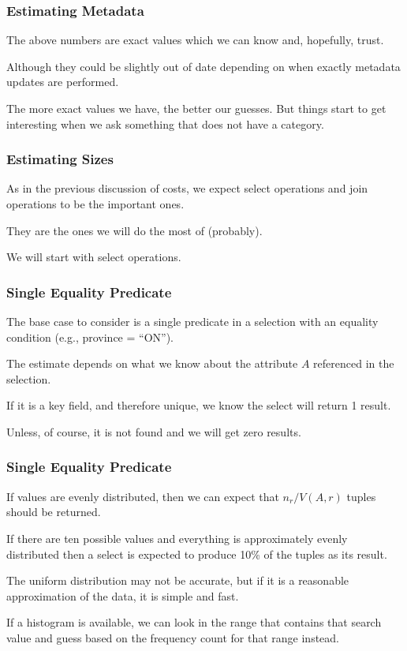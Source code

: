 \begin{frame}
\frametitle{Estimating Metadata}

The above numbers are exact values which we can know and, hopefully, trust. 

Although they could be slightly out of date depending on when exactly metadata updates are performed. 

The more exact values we have, the better our guesses. But things start to get interesting when we ask something that does not have a category.


\end{frame}

\begin{frame}
\frametitle{Estimating Sizes}

As in the previous discussion of costs, we expect select operations and join operations to be the important ones.

They are the ones we will do the most of (probably).

We will start with select operations.

\end{frame}

\begin{frame}
\frametitle{Single Equality Predicate}

The base case to consider is a single predicate in a selection with an equality condition (e.g., province = ``ON''). 

The estimate depends on what we know about the attribute $A$ referenced in the selection. 

If it is a key field, and therefore unique, we know the select will return 1 result. 

Unless, of course, it is not found and we will get zero results.

\end{frame}

\begin{frame}
\frametitle{Single Equality Predicate}

If values are evenly distributed, then we can expect that $n_{r}/V(A, r)$ tuples should be returned. 

If there are ten possible values and everything is approximately evenly distributed then a select is expected to produce 10\% of the tuples as its result. 

The uniform distribution may not be accurate, but if it is a reasonable approximation of the data, it is simple and fast. 

If a histogram is available, we can look in the range that contains that search value and guess based on the frequency count for that range instead.

\end{frame}


